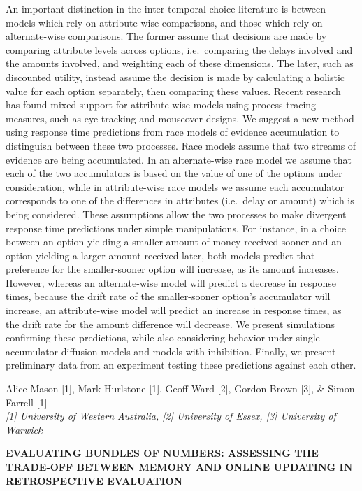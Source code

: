 \documentclass[]{article}
\begin{document}
An important distinction in the inter-temporal choice literature is
between models which rely on attribute-wise comparisons, and those which
rely on alternate-wise comparisons. The former assume that decisions are
made by comparing attribute levels across options, i.e.~comparing the
delays involved and the amounts involved, and weighting each of these
dimensions. The later, such as discounted utility, instead assume the
decision is made by calculating a holistic value for each option
separately, then comparing these values. Recent research has found mixed
support for attribute-wise models using process tracing measures, such
as eye-tracking and mouseover designs. We suggest a new method using
response time predictions from race models of evidence accumulation to
distinguish between these two processes. Race models assume that two
streams of evidence are being accumulated. In an alternate-wise race
model we assume that each of the two accumulators is based on the value
of one of the options under consideration, while in attribute-wise race
models we assume each accumulator corresponds to one of the differences
in attributes (i.e.~delay or amount) which is being considered. These
assumptions allow the two processes to make divergent response time
predictions under simple manipulations. For instance, in a choice
between an option yielding a smaller amount of money received sooner and
an option yielding a larger amount received later, both models predict
that preference for the smaller-sooner option will increase, as its
amount increases. However, whereas an alternate-wise model will predict
a decrease in response times, because the drift rate of the
smaller-sooner option's accumulator will increase, an attribute-wise
model will predict an increase in response times, as the drift rate for
the amount difference will decrease. We present simulations confirming
these predictions, while also considering behavior under single
accumulator diffusion models and models with inhibition. Finally, we
present preliminary data from an experiment testing these predictions
against each other.\\
\pagebreak  

Alice Mason {[}1{]}, Mark Hurlstone {[}1{]}, Geoff Ward {[}2{]}, Gordon
Brown {[}3{]}, \& Simon Farrell {[}1{]}\\
\emph{{[}1{]} University of Western Australia, {[}2{]} University of
Essex, {[}3{]} University of Warwick}

\textbf{EVALUATING BUNDLES OF NUMBERS: ASSESSING THE TRADE-OFF BETWEEN
MEMORY AND ONLINE UPDATING IN RETROSPECTIVE EVALUATION}
\end{document}
